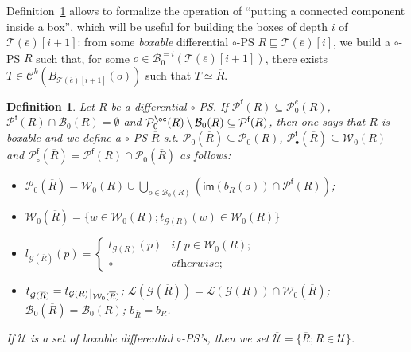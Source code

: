 \documentclass{article}
\newcommand{\target}[1]{t_{#1}}
\theoremstyle{plain}
\newtheorem{definition}{Definition}
\newcommand{\connectedcomponents}[2]{\mathcal{C}^{#2}(#1)}
\newcommand{\leftwires}[1]{\mathcal{L}(#1)}
\newcommand{\labelofcell}[1]{l_{#1}}
\newcommand{\taylor}[2]{\mathcal{T}(#1)[#2]}
\newcommand{\groundof}[1]{\mathcal{G}(#1)}
\def\restriction#1#2{\mathchoice
              {\setbox1\hbox{${\displaystyle #1}_{\scriptstyle #2}$}
              \restrictionaux{#1}{#2}}
              {\setbox1\hbox{${\textstyle #1}_{\scriptstyle #2}$}
              \restrictionaux{#1}{#2}}
              {\setbox1\hbox{${\scriptstyle #1}_{\scriptscriptstyle #2}$}
              \restrictionaux{#1}{#2}}
              {\setbox1\hbox{${\scriptscriptstyle #1}_{\scriptscriptstyle #2}$}
              \restrictionaux{#1}{#2}}}
\def\restrictionaux#1#2{{#1\,\smash{\vrule height .8\ht1 depth .85\dp1}}_{\,#2}}
\newcommand{\im}[1]{\textsf{im}(#1)}
\newcommand{\cod}{\oc}
\newcommand{\portsatzero}[1]{\mathcal{P}_0(#1)}
\newcommand{\wiresatzero}[1]{\mathcal{W}_0(#1)}
\newcommand{\conclusions}[1]{\mathcal{P}^{\textsf{f}}(#1)}
\newcommand{\portsatzerooftype}[2]{\mathcal{P}_0^{#1}(#2)}
\newcommand{\exponentialportsatzero}[1]{\mathcal{P}_0^\textit{e}(#1)}
\newcommand{\conclusionscirc}[1]{\mathcal{P}_\circ^{\textsf{f}}(#1)}
\newcommand{\conclusionsnotcirc}[1]{\mathcal{P}_\bullet^{\textsf{f}}(#1)}
\newcommand{\boxesatzero}[1]{\mathcal{B}_{0}(#1)}
\newcommand{\exactboxesatzero}[2]{\mathcal{B}_{0}^{=#2}(#1)}
\begin{document}
Definition~\ref{defin: overline} allows to formalize the operation of ``putting a connected component inside a box'', which will be useful for building the boxes of depth $i$  of $\taylor{\overline{e}}{i+1}$: from some \emph{boxable} differential $\circ$-PS $R \sqsubseteq \taylor{\overline{e}}{i}$, we build a $\circ$-PS $\overline{R}$ such that, for some $o \in \exactboxesatzero{\taylor{\overline{e}}{i+1}}{i}$, there exists $T \in \connectedcomponents{B_{\taylor{\overline{e}}{i+1}}(o)}{k}$ such that $T \simeq \overline{R}$.




\begin{definition}\label{defin: overline}Let $R$ be a differential $\circ$-PS. If $\conclusions{R} \subseteq \exponentialportsatzero{R}$, $\conclusions{R} \cap \boxesatzero{R} = \emptyset$ and $\portsatzerooftype{\cod}{R} \setminus \boxesatzero{R} \subseteq \conclusions{R}$, then one says that $R$ is \emph{boxable} and we define a $\circ$-PS $\overline{R}$ s.t. $\portsatzero{\overline{R}} \subseteq \portsatzero{R}$, $\conclusionsnotcirc{\overline{R}} \subseteq \wiresatzero{R}$ and $\conclusionscirc{\overline{R}} = \conclusions{R} \cap \portsatzero{\overline{R}}$ as follows:
\begin{itemize}
\item $\portsatzero{\overline{R}} = \wiresatzero{R} \cup \bigcup_{o \in \boxesatzero{R}} (\im{b_R(o)} \cap \conclusions{R})$;
\item $\wiresatzero{\overline{R}} = \{ w \in \wiresatzero{R} ; \target{\groundof{R}}(w) \in \wiresatzero{R} \}$
\item $\labelofcell{\groundof{\overline{R}}}(p) = \left\lbrace \begin{array}{ll} 
\labelofcell{\groundof{R}}(p) & \textit{if $p \in \wiresatzero{R}$;}\\
\circ & \textit{otherwise;}
\end{array} \right.$
\item $\target{\groundof{\overline{R}}} = \restriction{\target{\groundof{R}}}{\wiresatzero{\overline{R}}}$; $\leftwires{\groundof{\overline{R}}} = \leftwires{\groundof{R}} \cap \wiresatzero{\overline{R}}$; $\boxesatzero{\overline{R}} = \boxesatzero{R}$; $b_{\overline{R}} = b_R$.
\end{itemize}
If $\mathcal{U}$ is a set of boxable differential $\circ$-PS's, 
then we set $\overline{\mathcal{U}} = \{ \overline{R} ; R \in \mathcal{U} \}$.
\end{definition}
\end{document}
